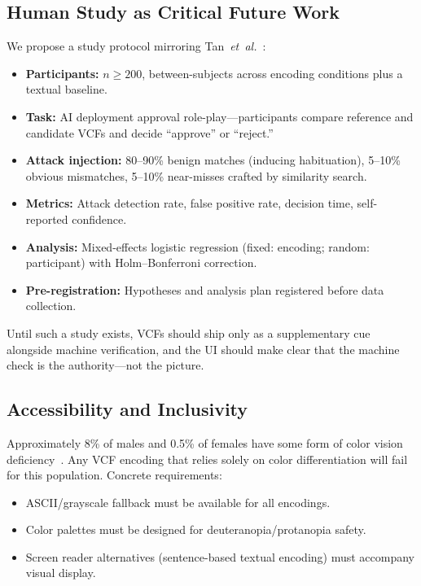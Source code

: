 \documentclass[conference,10pt]{IEEEtran}
\newcommand{\etal}{\textit{et~al.}}
\begin{document}
\subsection{Human Study as Critical Future Work}

We propose a study protocol mirroring Tan~\etal~\cite{tan2017unicorns}:

\begin{itemize}[leftmargin=*,nosep]
  \item \textbf{Participants:} $n \geq 200$, between-subjects across encoding conditions plus a textual baseline.
  \item \textbf{Task:} AI deployment approval role-play---participants compare reference and candidate VCFs and decide ``approve'' or ``reject.''
  \item \textbf{Attack injection:} 80--90\% benign matches (inducing habituation), 5--10\% obvious mismatches, 5--10\% near-misses crafted by similarity search.
  \item \textbf{Metrics:} Attack detection rate, false positive rate, decision time, self-reported confidence.
  \item \textbf{Analysis:} Mixed-effects logistic regression (fixed: encoding; random: participant) with Holm--Bonferroni correction.
  \item \textbf{Pre-registration:} Hypotheses and analysis plan registered before data collection.
\end{itemize}

Until such a study exists, VCFs should ship only as a supplementary cue alongside machine verification, and the UI should make clear that the machine check is the authority---not the picture.

\subsection{Accessibility and Inclusivity}

Approximately 8\% of males and 0.5\% of females have some form of color vision deficiency~\cite{hsiao2009study}.
Any VCF encoding that relies solely on color differentiation will fail for this population.
Concrete requirements:

\begin{itemize}[leftmargin=*,nosep]
  \item ASCII/grayscale fallback must be available for all encodings.
  \item Color palettes must be designed for deuteranopia/protanopia safety.
  \item Screen reader alternatives (sentence-based textual encoding) must accompany visual display.
\end{itemize}
\end{document}
